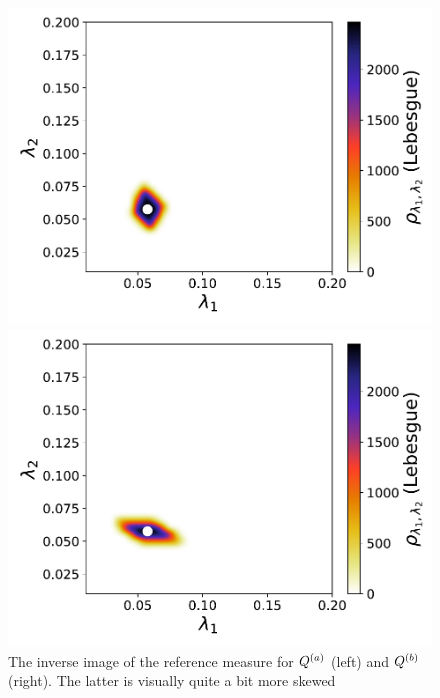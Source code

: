 \begin{figure}[h]
\begin{minipage}{.475\textwidth}
\includegraphics[width=\linewidth]{./images/refheat_pt0Q1_M1N40000_2D_0_1}
\end{minipage}
\begin{minipage}{.475\textwidth}
\includegraphics[width=\linewidth]{./images/refheat_pt0Q2_M1N40000_2D_0_1}
\end{minipage}
\caption{The inverse image of the reference measure for $Q^{(a)}$ (left) and $Q^{(b)}$ (right). The latter is visually quite a bit more skewed }
\label{fig:NLbotleft}
\end{figure}

